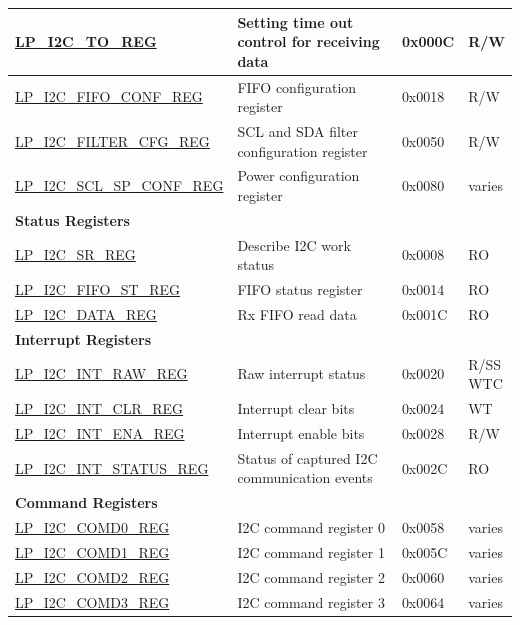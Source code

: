 \begin{longtable}{ | p{6cm} | p{7.2cm} | p{1.3cm} | p{1cm} | }
    \hyperref[regdesc:LPI2CTOREG]{LP\_I2C\_TO\_REG} & Setting time out control for receiving data & 0x000C & R/W \\ \hline
    \hyperref[regdesc:LPI2CFIFOCONFREG]{LP\_I2C\_FIFO\_CONF\_REG} & FIFO configuration register & 0x0018 & R/W \\ \hline
    \hyperref[regdesc:LPI2CFILTERCFGREG]{LP\_I2C\_FILTER\_CFG\_REG} & SCL and SDA filter configuration register & 0x0050 & R/W \\ \hline
    \hyperref[regdesc:LPI2CSCLSPCONFREG]{LP\_I2C\_SCL\_SP\_CONF\_REG} & Power configuration register & 0x0080 & varies \\ \hline
    \multicolumn{4}{|l|}{\textbf{Status Registers}} \\ \hline
    \hyperref[regdesc:LPI2CSRREG]{LP\_I2C\_SR\_REG} & Describe I2C work status & 0x0008 & RO \\ \hline
    \hyperref[regdesc:LPI2CFIFOSTREG]{LP\_I2C\_FIFO\_ST\_REG} & FIFO status register & 0x0014 & RO \\ \hline
    \hyperref[regdesc:LPI2CDATAREG]{LP\_I2C\_DATA\_REG} & Rx FIFO read data & 0x001C & RO \\ \hline
    \multicolumn{4}{|l|}{\textbf{Interrupt Registers}} \\ \hline
    \hyperref[regdesc:LPI2CINTRAWREG]{LP\_I2C\_INT\_RAW\_REG} & Raw interrupt status & 0x0020 & \makecell{R/SS \\ WTC} \\ \hline
    \hyperref[regdesc:LPI2CINTCLRREG]{LP\_I2C\_INT\_CLR\_REG} & Interrupt clear bits & 0x0024 & WT \\ \hline
    \hyperref[regdesc:LPI2CINTENAREG]{LP\_I2C\_INT\_ENA\_REG} & Interrupt enable bits & 0x0028 & R/W \\ \hline
    \hyperref[regdesc:LPI2CINTSTATUSREG]{LP\_I2C\_INT\_STATUS\_REG} & Status of captured I2C communication events & 0x002C & RO \\ \hline
    \multicolumn{4}{|l|}{\textbf{Command Registers}} \\ \hline
    \hyperref[regdesc:LPI2CCOMD0REG]{LP\_I2C\_COMD0\_REG} & I2C command register 0 & 0x0058 & varies \\ \hline
    \hyperref[regdesc:LPI2CCOMD1REG]{LP\_I2C\_COMD1\_REG} & I2C command register 1 & 0x005C & varies \\ \hline
    \hyperref[regdesc:LPI2CCOMD2REG]{LP\_I2C\_COMD2\_REG} & I2C command register 2 & 0x0060 & varies \\ \hline
    \hyperref[regdesc:LPI2CCOMD3REG]{LP\_I2C\_COMD3\_REG} & I2C command register 3 & 0x0064 & varies \\ \hline

\end{longtable}
